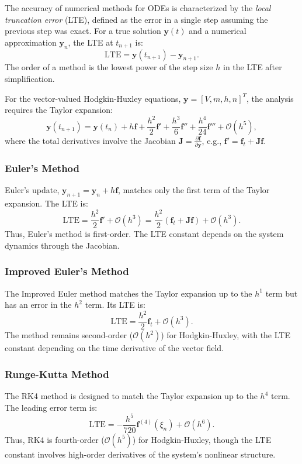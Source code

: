 The accuracy of numerical methods for ODEs is characterized by the \textit{local truncation error} (LTE), defined as the error in a single step assuming the previous step was exact. For a true solution \(\mathbf{y}(t)\) and a numerical approximation \(\mathbf{y}_n\), the LTE at \(t_{n+1}\) is:
\[
\text{LTE} = \mathbf{y}(t_{n+1}) - \mathbf{y}_{n+1}.
\]
The order of a method is the lowest power of the step size \(h\) in the LTE after simplification.

For the vector-valued Hodgkin-Huxley equations, \(\mathbf{y} = [V, m, h, n]^T\), the analysis requires the Taylor expansion:
\[
\mathbf{y}(t_{n+1}) = \mathbf{y}(t_n) + h\mathbf{f} + \frac{h^2}{2}\mathbf{f}' + \frac{h^3}{6}\mathbf{f}'' + \frac{h^4}{24}\mathbf{f}''' + \mathcal{O}(h^5),
\]
where the total derivatives involve the Jacobian \(\mathbf{J} = \frac{\partial \mathbf{f}}{\partial \mathbf{y}}\), e.g., \(\mathbf{f}' = \mathbf{f}_t + \mathbf{J}\mathbf{f}\).

\subsubsection{Euler's Method}
\label{subsubsec:euler-method-accuracy}

Euler's update, \(\mathbf{y}_{n+1} = \mathbf{y}_n + h\mathbf{f}\), matches only the first term of the Taylor expansion. The LTE is:
\[
\text{LTE} = \frac{h^2}{2}\mathbf{f}' + \mathcal{O}(h^3) = \frac{h^2}{2}(\mathbf{f}_t + \mathbf{J}\mathbf{f}) + \mathcal{O}(h^3).
\]
Thus, Euler's method is first-order. The LTE constant depends on the system dynamics through the Jacobian.

\subsubsection{Improved Euler's Method}
\label{subsubsec:improved-euler-accuracy}
The Improved Euler method matches the Taylor expansion up to the \(h^1\) term but has an error in the \(h^2\) term. Its LTE is:
\[
\text{LTE} = \frac{h^2}{2}\mathbf{f}_t + \mathcal{O}(h^3).
\]
The method remains second-order (\(\mathcal{O}(h^2)\)) for Hodgkin-Huxley, with the LTE constant depending on the time derivative of the vector field.

\subsubsection{Runge-Kutta Method}
\label{subsubsec:runge-kutta-accuracy}
The RK4 method is designed to match the Taylor expansion up to the \(h^4\) term. The leading error term is:
\[
\text{LTE} = -\frac{h^5}{720}\mathbf{f}^{(4)}(\xi_n) + \mathcal{O}(h^6).
\]
Thus, RK4 is fourth-order (\(\mathcal{O}(h^5)\)) for Hodgkin-Huxley, though the LTE constant involves high-order derivatives of the system's nonlinear structure.